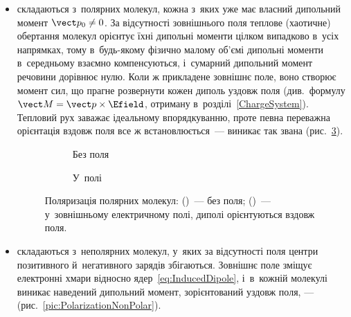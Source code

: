\begin{itemize}
	\item {} складаються з~полярних молекул, кожна з~яких уже має
	      власний дипольний момент $\vect p_0 \neq 0$. За відсутності зовнішнього поля теплове
	      (хаотичне) обертання молекул орієнтує їхні дипольні моменти цілком випадково в~усіх
	      напрямках, тому в~будь-якому фізично малому об'ємі дипольні моменти в~середньому
	      взаємно компенсуються, і~сумарний дипольний момент речовини дорівнює нулю. Коли ж
	      прикладене зовнішнє поле, воно створює момент сил, що прагне розвернути кожен диполь
	      уздовж поля (див.~формулу $\vect M = \vect p\times\Efield$, отриману
	      в~розділі~\ref{ChargeSystem}). Тепловий рух заважає ідеальному впорядкуванню, проте певна
	      переважна орієнтація вздовж поля все ж встановлюється~--- виникає так звана
	       (рис.~\ref{pic:PolarizationPolar}).

	      \begin{figure}[h!]
		      \centering
		      \begin{subfigure}[t]{0.48\linewidth}
			      \centering
			      \caption{Без поля}
			      \label{pic:PolarNoField}
		      \end{subfigure}\hfill
		      \begin{subfigure}[t]{0.48\linewidth}
			      \centering
			      \caption{У~полі}
			      \label{pic:PolarField}
		      \end{subfigure}
		      \caption{Поляризація полярних молекул:
		      (\protect{})~--- без поля;
		      (\protect{})~--- у~зовнішньому електричному полі,
		      диполі орієнтуються вздовж поля.}
		      \label{pic:PolarizationPolar}
	      \end{figure}

	\item {} складаються з~неполярних молекул, у~яких за
	      відсутності поля центри позитивного й~негативного зарядів збігаються. Зовнішнє поле
	      зміщує електронні хмари відносно ядер~\eqref{eq:InducedDipole}, і~в~кожній
	      молекулі виникає наведений дипольний момент, зорієнтований уздовж поля, ---
	       (рис.~\ref{pic:PolarizationNonPolar}).


\end{itemize}
